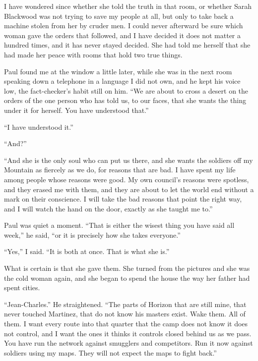 I have wondered since whether she told the truth in that room, or whether Sarah Blackwood was not trying to save my people at all, but only to take back a machine stolen from her by cruder men. I could never afterward be sure which woman gave the orders that followed, and I have decided it does not matter a hundred times, and it has never stayed decided. She had told me herself that she had made her peace with rooms that hold two true things.\par

Paul found me at the window a little later, while she was in the next room speaking down a telephone in a language I did not own, and he kept his voice low, the fact-checker's habit still on him. ``We are about to cross a desert on the orders of the one person who has told us, to our faces, that she wants the thing under it for herself. You have understood that.''\par

``I have understood it.''\par

``And?''\par

``And she is the only soul who can put us there, and she wants the soldiers off my Mountain as fiercely as we do, for reasons that are bad. I have spent my life among people whose reasons were good. My own council's reasons were spotless, and they erased me with them, and they are about to let the world end without a mark on their conscience. I will take the bad reasons that point the right way, and I will watch the hand on the door, exactly as she taught me to.''\par

Paul was quiet a moment. ``That is either the wisest thing you have said all week,'' he said, ``or it is precisely how she takes everyone.''\par

``Yes,'' I said. ``It is both at once. That is what she is.''\par

What is certain is that she gave them. She turned from the pictures and she was the cold woman again, and she began to spend the house the way her father had spent cities.\par

``Jean-Charles.'' He straightened. ``The parts of Horizon that are still mine, that never touched Martinez, that do not know his masters exist. Wake them. All of them. I want every route into that quarter that the camp does not know it does not control, and I want the ones it thinks it controls closed behind us as we pass. You have run the network against smugglers and competitors. Run it now against soldiers using my maps. They will not expect the maps to fight back.''\par

